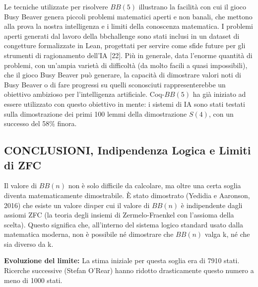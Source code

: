 \documentclass[12pt, a4paper, oneside]{article}
\begin{document}
Le tecniche utilizzate per risolvere $BB(5)$ illustrano la facilità con cui il gioco Busy Beaver genera piccoli problemi matematici aperti e non banali, che mettono alla prova la nostra intelligenza e i limiti della conoscenza matematica. I problemi aperti generati dal lavoro della bbchallenge sono stati inclusi in un dataset di congetture formalizzate in Lean, progettati per servire come sfide future per gli strumenti di ragionamento dell'IA [22]. Più in generale, data l'enorme quantità di problemi, con un'ampia varietà di difficoltà (da molto facili a quasi impossibili), che il gioco Busy Beaver può generare, la capacità di dimostrare valori noti di Busy Beaver o di fare progressi su quelli sconosciuti rappresenterebbe un obiettivo ambizioso per l'intelligenza artificiale. Coq-$BB(5)$ ha già iniziato ad essere utilizzato con questo obiettivo in mente: i sistemi di IA sono stati testati sulla dimostrazione dei primi 100 lemmi della dimostrazione $S(4)$, con un successo del 58\% finora.

\subsection*{CONCLUSIONI, Indipendenza Logica e Limiti di ZFC}
Il valore di $BB(n)$ non è solo difficile da calcolare, ma oltre una certa soglia diventa matematicamente dimostrabile. È stato dimostrato (Yedidia e Aaronson, 2016) che esiste un valore di$ n $per cui il valore di $BB(n)$ è indipendente dagli assiomi ZFC (la teoria degli insiemi di Zermelo-Fraenkel con l'assioma della scelta). Questo significa che, all'interno del sistema logico standard usato dalla matematica moderna, non è possibile né dimostrare che $BB(n)$ valga k, né che sia diverso da k.

\textbf{Evoluzione del limite:} 
La stima iniziale per questa soglia era di 7910 stati. Ricerche successive (Stefan O'Rear) hanno ridotto drasticamente questo numero a meno di 1000 stati.
\end{document}
